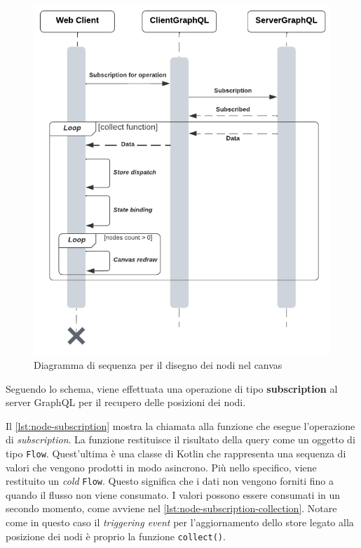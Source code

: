 \begin{figure}[htb]
	\centering
	\includegraphics[scale=0.8]{imgs/Sequenza_rendering_plus.pdf}
	\caption{Diagramma di sequenza per il disegno dei nodi nel canvas}
	\label{fig:sequence-rendering-advance}
\end{figure}
Seguendo lo schema, viene effettuata una operazione di tipo \textbf{subscription} al server GraphQL per il recupero delle posizioni dei nodi. 

Il \cref{lst:node-subscription} mostra la chiamata alla funzione che esegue l'operazione di \textit{subscription}. La funzione restituisce il risultato della query come un oggetto di tipo \texttt{Flow}. Quest'ultima è una classe di Kotlin che rappresenta una sequenza di valori che vengono prodotti in modo asincrono. Più nello specifico, viene restituito un \textit{cold} \texttt{Flow}. Questo significa che i dati non vengono forniti  fino a quando il flusso non viene consumato. I valori possono essere consumati in un secondo momento, come avviene nel  \cref{lst:node-subscription-collection}. Notare come in questo caso il \textit{triggering event} per l'aggiornamento dello store legato alla posizione dei nodi è proprio la funzione \texttt{collect()}.

 
